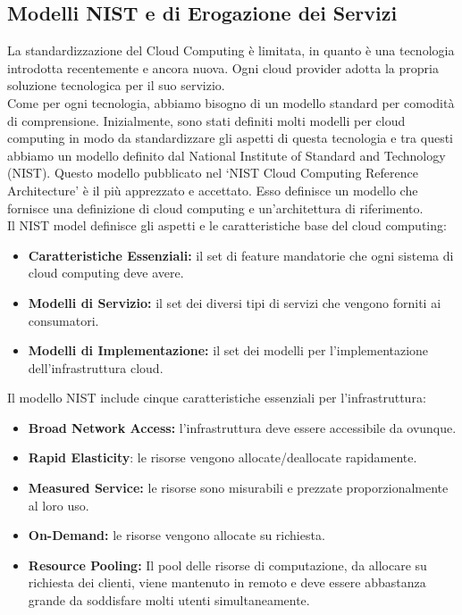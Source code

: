 \documentclass{article}
\begin{document}
\newpage
\subsection{Modelli NIST e di Erogazione dei Servizi}
La standardizzazione del Cloud Computing è limitata, in quanto è una tecnologia introdotta recentemente e ancora nuova. Ogni cloud provider adotta la propria soluzione tecnologica per il suo servizio.\\
Come per ogni tecnologia, abbiamo bisogno di un modello standard per comodità di comprensione. Inizialmente, sono stati definiti molti modelli per cloud computing in modo da standardizzare gli aspetti di questa tecnologia e tra questi abbiamo un modello definito dal National Institute of Standard and Technology (NIST). Questo modello pubblicato nel ‘NIST Cloud Computing Reference Architecture’ è il più apprezzato e accettato. Esso definisce un modello che fornisce una definizione di cloud computing e un’architettura di riferimento.\\
Il NIST model definisce gli aspetti e le caratteristiche base del cloud computing:
\begin{itemize}
    \item \textbf{Caratteristiche Essenziali:} il set di feature mandatorie che ogni sistema di cloud computing deve avere.
    \item \textbf{Modelli di Servizio:} il set dei diversi tipi di servizi che vengono forniti ai consumatori.
    \item \textbf{Modelli di Implementazione:} il set dei modelli per l’implementazione dell’infrastruttura cloud.
\end{itemize}
Il modello NIST include cinque caratteristiche essenziali per l’infrastruttura:
\begin{itemize}
    \item \textbf{Broad Network Access:} l’infrastruttura deve essere accessibile da ovunque.
    \item \textbf{Rapid Elasticity}: le risorse vengono allocate/deallocate rapidamente.
    \item \textbf{Measured Service:} le risorse sono misurabili e prezzate proporzionalmente al loro uso.
    \item \textbf{On-Demand:} le risorse vengono allocate su richiesta.
    \item \textbf{Resource Pooling:} Il pool delle risorse di computazione, da allocare su richiesta dei clienti, viene mantenuto in remoto e deve essere abbastanza grande da soddisfare molti utenti simultaneamente.
\end{itemize}
\end{document}
